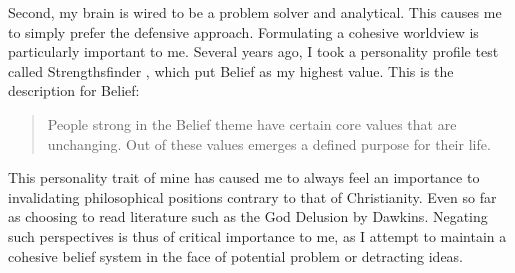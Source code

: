 Second, my brain is wired to be a problem solver and analytical. This causes me to simply prefer the defensive approach. Formulating a cohesive worldview is particularly important to me. Several years ago, I took a personality profile test called Strengthsfinder \autocite{rath2007strengthsfinder}, which put Belief as my highest value. This is the description for Belief:

\begin{quotation}
People strong in the Belief theme have certain core values that are unchanging. Out
of these values emerges a defined purpose for their life.
\end{quotation}

This personality trait of mine has caused me to always feel an importance to invalidating philosophical positions contrary to that of Christianity. Even so far as choosing to read literature such as the God Delusion by Dawkins. Negating such perspectives is thus of critical importance to me, as I attempt to maintain a cohesive belief system in the face of potential problem or detracting ideas.

\newpage
\printbibliography




